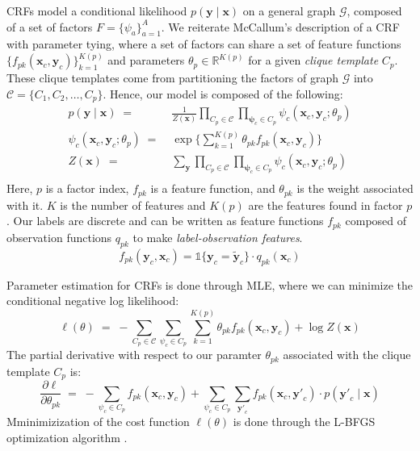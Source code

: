 \documentclass{article}
\begin{document}
CRFs model a conditional likelihood $p(\mathbf{y} \mid \mathbf{x})$ on a general
graph $\mathcal{G}$, composed of a set of factors
$F = \{ \psi_a \} _{a=1}^{A}$. We reiterate McCallum's description
of a CRF with parameter tying, where a set of factors can share a set of feature
functions $\{f_{pk}\left(\mathbf{x}_c, \mathbf{y}_c \right)\}_{k=1}^{K(p)}$ and
parameters $\theta_p \in \mathbb{R}^{K(p)}$ for a given \textit{clique template}
$C_p$. These clique templates come from partitioning the factors of graph
$\mathcal{G}$ into $\mathcal{C} = \{C_1, C_2, \hdots, C_p \}$. Hence, our model
is composed of the following:
\begin{equation}
  \begin{aligned}
    p(\mathbf{y} \mid \mathbf{x}) \; = \; & \frac{1}{Z(\mathbf{x})} \prod_{C_p \in \mathcal{C}} \prod_{\mathbf{\psi}_c \in C_p} \psi_c (\mathbf{x}_c, \mathbf{y}_c ; \theta_p) \\
    \psi_c (\mathbf{x}_c, \mathbf{y}_c ; \theta_p ) \; = \; & \exp \Bigg\{ \sum_{k=1}^{K(p)} \theta_{pk} f_{pk} (\mathbf{x}_c, \mathbf{y}_c) \Bigg\} \\
    Z(\mathbf{x}) \; = \; & \sum_{\mathbf{y}} \prod_{C_p \in \mathcal{C}} \prod_{\mathbf{\psi}_c \in C_p} \psi_c (\mathbf{x}_c, \mathbf{y}_c ; \theta_p) \\
  \end{aligned}
\end{equation}
Here, $p$ is a factor index, $f_{pk}$ is a feature function, and $\theta_{pk}$ is the
weight associated with it. $K$ is the number of features and $K(p)$ are the
features found in factor $p$.
Our labels are discrete and can be written as
feature functions $f_{pk}$ composed  of observation functions $q_{pk}$ to make
\textit{label-observation features}.
\begin{equation}
  f_{pk} (\mathbf{y}_c, \mathbf{x}_c) = \mathds{1} \{\mathbf{y}_c = \mathbf{\widetilde{y}}_c\} \cdot q_{pk}(\mathbf{x}_c)
\end{equation}

Parameter estimation for CRFs is done through MLE,
where we can minimize the conditional negative log likelihood:
\begin{equation}
  \ell (\theta) \; = \; - \sum_{C_p \in \mathcal{C}} \sum_{\psi_c \in C_p} \sum_{k=1}^{K(p)} \theta_{pk} f_{pk} (\mathbf{x}_c, \mathbf{y}_c) + \log Z(\mathbf{x})
\end{equation}
The partial derivative with respect to our paramter $\theta_{pk}$ associated
with the clique template $C_p$ is:
\begin{equation}
  \frac{\partial \ell}{\partial \theta_{pk}} \; = \; - \sum_{\psi_c \in C_p} f_{pk} (\mathbf{x}_c, \mathbf{y}_c) + \sum_{\psi_c \in C_p} \sum_{\mathbf{y'}_c} f_{pk} (\mathbf{x}_c, \mathbf{y'}_c) \cdot p(\mathbf{y'}_c \mid \mathbf{x})
\end{equation}
Mminimizization of the cost function $\ell(\theta)$ is done through the L-BFGS
optimization algorithm \cite{Nowozin}.
\end{document}
